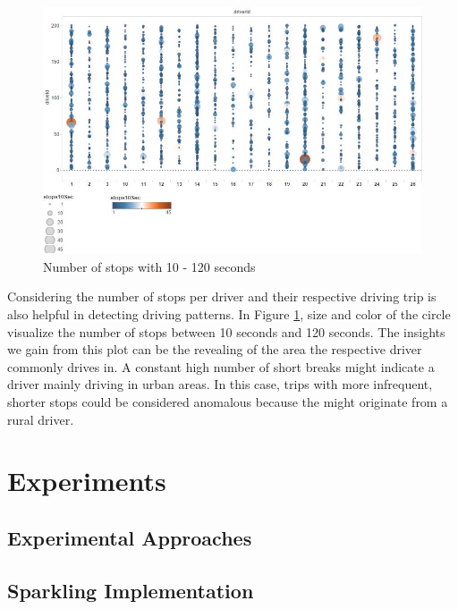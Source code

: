 \documentclass{vldb}
\begin{document}
\begin{figure}
\centering
\includegraphics[width=\linewidth]{"pics/number-of-breaks-10-120"}%
\caption{Number of stops with 10 - 120 seconds}
\label{fig:number-of-breaks-10-120}
\end{figure}
Considering the number of stops per driver and their respective driving trip is also helpful in detecting driving patterns. In Figure \ref{fig:number-of-breaks-10-120}, size and color of the circle visualize the number of stops between 10 seconds and 120 seconds. The insights we gain from this plot can be the revealing of the area the respective driver commonly drives in. A constant high number of short breaks might indicate a driver mainly driving in urban areas. In this case, trips with more infrequent, shorter stops could be considered anomalous because the might originate from a rural driver.



\section{Experiments}
\label{sec:Experiments}

\subsection{Experimental Approaches}
\label{subsec:ExpPlan}

\subsection{Sparkling Implementation}
\label{subsec:sparkling-impl}
\end{document}
